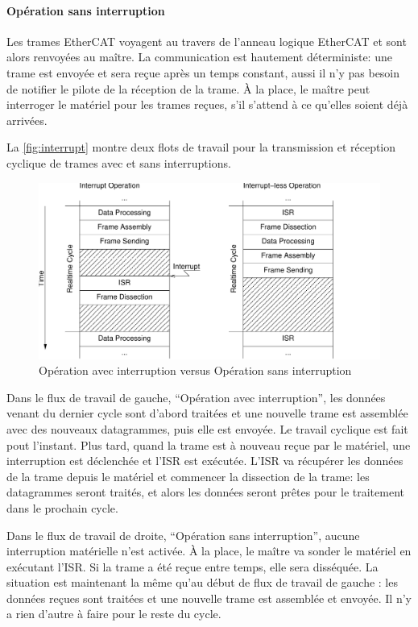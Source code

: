 \documentclass[a4paper,12pt,BCOR6mm,bibtotoc,idxtotoc]{scrbook}
\begin{document}
\paragraph{Op\'eration sans interruption}
Les trames EtherCAT voyagent au travers de l'anneau logique EtherCAT
et sont alors renvoy\'ees au ma\^itre.  La communication est hautement
d\'eterministe: une trame est envoy\'ee et sera re\c{c}ue apr\`es un
temps constant, aussi il n'y pas besoin de notifier le pilote de la
r\'eception de la trame. \`A la place, le ma\^itre peut interroger le
mat\'eriel pour les trames re\c{c}ues, s'il s'attend \`a ce qu'elles
soient d\'ej\`a arriv\'ees.


La \autoref{fig:interrupt} montre deux flots de travail pour la
transmission et r\'eception cyclique de trames avec et sans
interruptions.

\begin{figure}[htbp]
  \centering
  \includegraphics[width=.9\textwidth]{images/interrupt}
  \caption{Op\'eration avec interruption versus Op\'eration sans interruption}
  \label{fig:interrupt}
\end{figure}

Dans le flux de travail de gauche, ``Op\'eration avec interruption'',
les donn\'ees venant du dernier cycle sont d'abord trait\'ees et une
nouvelle trame est assembl\'ee avec des nouveaux datagrammes, puis
elle est envoy\'ee.  Le travail cyclique est fait pout l'instant.
Plus tard, quand la trame est \`a nouveau re\c{c}ue par le mat\'eriel,
une interruption est d\'eclench\'ee et l'ISR est ex\'ecut\'ee.  L'ISR
va r\'ecup\'erer les donn\'ees de la trame depuis le mat\'eriel et
commencer la dissection de la trame: les datagrammes seront trait\'es,
et alors les donn\'ees seront pr\^etes pour le traitement dans le
prochain cycle.

Dans le flux de travail de droite, ``Op\'eration sans interruption'',
aucune interruption mat\'erielle n'est activ\'ee. \`A la place, le
ma\^itre va sonder le mat\'eriel en ex\'ecutant l'ISR. Si la trame a
\'et\'e re\c{c}ue entre temps, elle sera diss\'equ\'ee. La situation est
maintenant la m\^eme qu'au d\'ebut de flux de travail de gauche : les
donn\'ees re\c{c}ues sont trait\'ees et une nouvelle trame est
assembl\'ee et envoy\'ee. Il n'y a rien d'autre \`a faire pour le
reste du cycle.
\end{document}
